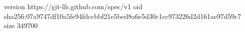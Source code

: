 version https://git-lfs.github.com/spec/v1
oid sha256:07a9747df10a5fe94fdccbbf21e5bed8a6e5d30c1cc973226d2d161ae97d59c7
size 349700
